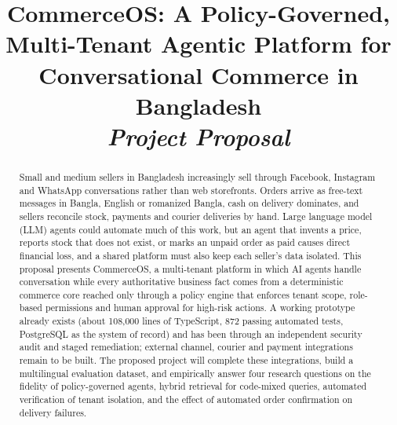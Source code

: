 \documentclass[conference,a4paper]{IEEEtran}
\begin{document}
\title{CommerceOS: A Policy-Governed, Multi-Tenant Agentic Platform for Conversational Commerce in Bangladesh\\[4pt]{\large\itshape Project Proposal}}

\author{
\and
{}
}

\maketitle

\begin{abstract}
Small and medium sellers in Bangladesh increasingly sell through Facebook, Instagram and WhatsApp conversations rather than web storefronts. Orders arrive as free-text messages in Bangla, English or romanized Bangla, cash on delivery dominates, and sellers reconcile stock, payments and courier deliveries by hand. Large language model (LLM) agents could automate much of this work, but an agent that invents a price, reports stock that does not exist, or marks an unpaid order as paid causes direct financial loss, and a shared platform must also keep each seller's data isolated. This proposal presents CommerceOS, a multi-tenant platform in which AI agents handle conversation while every authoritative business fact comes from a deterministic commerce core reached only through a policy engine that enforces tenant scope, role-based permissions and human approval for high-risk actions. A working prototype already exists (about 108,000 lines of TypeScript, 872 passing automated tests, PostgreSQL as the system of record) and has been through an independent security audit and staged remediation; external channel, courier and payment integrations remain to be built. The proposed project will complete these integrations, build a multilingual evaluation dataset, and empirically answer four research questions on the fidelity of policy-governed agents, hybrid retrieval for code-mixed queries, automated verification of tenant isolation, and the effect of automated order confirmation on delivery failures.
\end{abstract}
\end{document}
